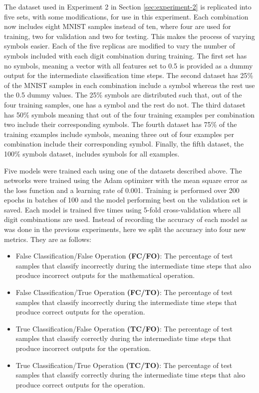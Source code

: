 The dataset used in Experiment 2 in Section \ref{sec:experiment-2} is replicated into five sets, with some modifications, for use in this experiment. Each combination now includes eight MNIST samples instead of ten, where four are used for training, two for validation and two for testing. This makes the process of varying symbols easier. Each of the five replicas are modified to vary the number of symbols included with each digit combination during training. The first set has no symbols, meaning a vector with all features set to 0.5 is provided as a dummy output for the intermediate classification time steps. The second dataset has 25\% of the MNIST samples in each combination include a symbol whereas the rest use the 0.5 dummy values. The 25\% symbols are distributed such that, out of the four training samples, one has a symbol and the rest do not. The third dataset has 50\% symbols meaning that out of the four training examples per combination two include their corresponding symbols. The fourth dataset has 75\% of the training examples include symbols, meaning three out of four examples per combination include their corresponding symbol. Finally, the fifth dataset, the 100\% symbols dataset, includes symbols for all examples.

Five models were trained each using one of the datasets described above. The networks were trained using the Adam optimizer with the mean square error as the loss function and a learning rate of 0.001. Training is performed over 200 epochs in batches of 100 and the model performing best on the validation set is saved. Each model is trained five times using 5-fold cross-validation where all digit combinations are used. Instead of recording the accuracy of each model as was done in the previous experiments, here we split the accuracy into four new metrics. They are as follows:
\begin{itemize}
	\item False Classification/False Operation \textbf{(FC/FO)}: The percentage of test samples that classify incorrectly during the intermediate time steps that also produce incorrect outputs for the mathematical operation.
	\item False Classification/True Operation \textbf{(FC/TO)}: The percentage of test samples that classify incorrectly during the intermediate time steps that produce correct outputs for the operation.
	\item True Classification/False Operation \textbf{(TC/FO)}: The percentage of test samples that classify correctly during the intermediate time steps that produce incorrect outputs for the operation.
	\item True Classification/True Operation \textbf{(TC/TO)}: The percentage of test samples that classify correctly during the intermediate time steps that also produce correct outputs for the operation.
\end{itemize}

